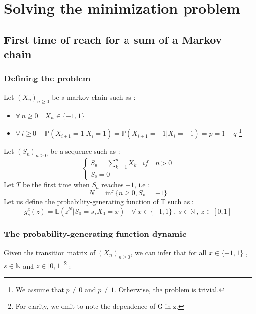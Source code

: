 \documentclass{article}
\begin{document}
\newpage
\section{Solving the minimization problem}
\subsection{First time of reach for a sum of a Markov chain}
\subsubsection{Defining the problem}

Let $(X_{n})_{n\geq0}$ be a markov chain such as :
\begin{itemize}
\item $\forall \, n\geq0 \quad X_{n} \in \{-1,1\} $ 
\item $\forall \, i\geq0 \quad\ \mathbb{P}( X_{i+1}=1 | X_i=1 ) = \mathbb{P}( X_{i+1}=-1 | X_i=-1 ) = p = 1-q$ \footnote{We assume that $p \ne 0$ and $p \ne 1$. Otherwise, the problem is trivial.}
\end{itemize}
Let $(S_{n})_{n\geq0}$ be a sequence such as :
\begin{equation}
     \begin{cases}
        S_{n} = \sum_{k=1}^{n}X_k & if \quad n > 0 \\
        S_0 = 0
     \end{cases}
\end{equation}
Let $T$ be the first time when $S_{n}$ reaches $-1$, i.e  :
$$ N= \inf \{ n\geq0 , S_{n}=-1   \} $$
Let us define the  probability-generating function of T such as :
$$ g_{s}^{x}(z) = \mathbb{E}(z^{N} | S_0=s, X_0=x) \quad \forall \ x \in \{-1,1\} \ , \ s \in \mathbb{N} \ , \ z \in [0,1]  $$

\subsubsection{The probability-generating function dynamic}
Given the transition matrix of $(X_{n})_{n\geq0}$, we can infer that for all $x \in \{-1,1\}$ , $s \in \mathbb{N}$ and $z \in ]0,1[$ \footnote{For clarity, we omit to note the dependence of G in z.} :
\end{document}
